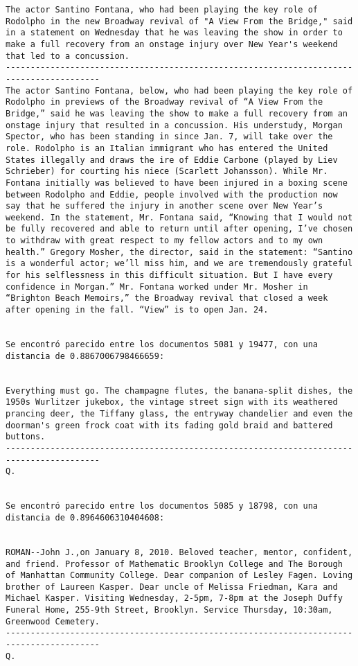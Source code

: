 \documentclass[11pt]{article}
\begin{document}
\begin{Verbatim}[commandchars=\\\{\}]
The actor Santino Fontana, who had been playing the key role of Rodolpho in the new Broadway revival of "A View From the Bridge," said in a statement on Wednesday that he was leaving the show in order to make a full recovery from an onstage injury over New Year's weekend that led to a concussion.
-----------------------------------------------------------------------------------------
The actor Santino Fontana, below, who had been playing the key role of Rodolpho in previews of the Broadway revival of “A View From the Bridge,” said he was leaving the show to make a full recovery from an onstage injury that resulted in a concussion. His understudy, Morgan Spector, who has been standing in since Jan. 7, will take over the role. Rodolpho is an Italian immigrant who has entered the United States illegally and draws the ire of Eddie Carbone (played by Liev Schrieber) for courting his niece (Scarlett Johansson). While Mr. Fontana initially was believed to have been injured in a boxing scene between Rodolpho and Eddie, people involved with the production now say that he suffered the injury in another scene over New Year’s weekend. In the statement, Mr. Fontana said, “Knowing that I would not be fully recovered and able to return until after opening, I’ve chosen to withdraw with great respect to my fellow actors and to my own health.” Gregory Mosher, the director, said in the statement: “Santino is a wonderful actor; we’ll miss him, and we are tremendously grateful for his selflessness in this difficult situation. But I have every confidence in Morgan.” Mr. Fontana worked under Mr. Mosher in “Brighton Beach Memoirs,” the Broadway revival that closed a week after opening in the fall. “View” is to open Jan. 24.


Se encontró parecido entre los documentos 5081 y 19477, con una distancia de 0.8867006798466659:


Everything must go. The champagne flutes, the banana-split dishes, the 1950s Wurlitzer jukebox, the vintage street sign with its weathered prancing deer, the Tiffany glass, the entryway chandelier and even the doorman's green frock coat with its fading gold braid and battered buttons.
-----------------------------------------------------------------------------------------
Q.


Se encontró parecido entre los documentos 5085 y 18798, con una distancia de 0.8964606310404608:


ROMAN--John J.,on January 8, 2010. Beloved teacher, mentor, confident, and friend. Professor of Mathematic Brooklyn College and The Borough of Manhattan Community College. Dear companion of Lesley Fagen. Loving brother of Laureen Kasper. Dear uncle of Melissa Friedman, Kara and Michael Kasper. Visiting Wednesday, 2-5pm, 7-8pm at the Joseph Duffy Funeral Home, 255-9th Street, Brooklyn. Service Thursday, 10:30am, Greenwood Cemetery.
-----------------------------------------------------------------------------------------
Q.



\end{Verbatim}
\end{document}
